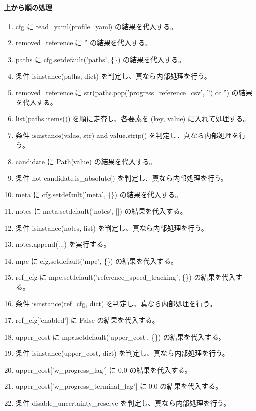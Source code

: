 \documentclass[a4paper,11pt]{article}
\begin{document}
            \paragraph{上から順の処理}
            \begin{enumerate}[leftmargin=1.8em]
            \item cfg に read\_yaml(profile\_yaml) の結果を代入する。
\item removed\_reference に '' の結果を代入する。
\item paths に cfg.setdefault('paths', \{\}) の結果を代入する。
\item 条件 isinstance(paths, dict) を判定し、真なら内部処理を行う。
\item   removed\_reference に str(paths.pop('progress\_reference\_csv', '') or '') の結果を代入する。
\item   list(paths.items()) を順に走査し、各要素を (key, value) に入れて処理する。
\item     条件 isinstance(value, str) and value.strip() を判定し、真なら内部処理を行う。
\item       candidate に Path(value) の結果を代入する。
\item       条件 not candidate.is\_absolute() を判定し、真なら内部処理を行う。
\item meta に cfg.setdefault('meta', \{\}) の結果を代入する。
\item notes に meta.setdefault('notes', []) の結果を代入する。
\item 条件 isinstance(notes, list) を判定し、真なら内部処理を行う。
\item   notes.append(...) を実行する。
\item mpc に cfg.setdefault('mpc', \{\}) の結果を代入する。
\item ref\_cfg に mpc.setdefault('reference\_speed\_tracking', \{\}) の結果を代入する。
\item 条件 isinstance(ref\_cfg, dict) を判定し、真なら内部処理を行う。
\item   ref\_cfg['enabled'] に False の結果を代入する。
\item upper\_cost に mpc.setdefault('upper\_cost', \{\}) の結果を代入する。
\item 条件 isinstance(upper\_cost, dict) を判定し、真なら内部処理を行う。
\item   upper\_cost['w\_progress\_lag'] に 0.0 の結果を代入する。
\item   upper\_cost['w\_progress\_terminal\_lag'] に 0.0 の結果を代入する。
\item   条件 disable\_uncertainty\_reserve を判定し、真なら内部処理を行う。

\end{enumerate}
\end{document}
